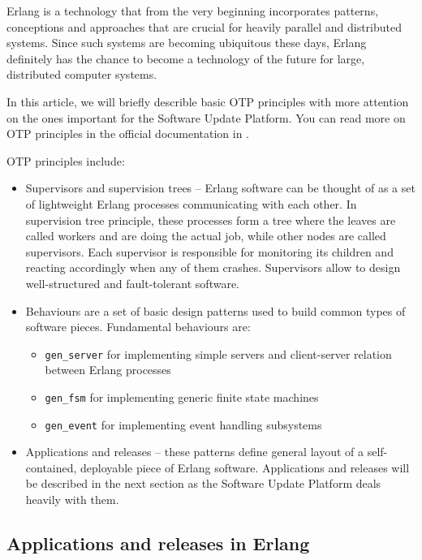 Erlang is a technology that from the very beginning incorporates patterns,
conceptions and approaches that are crucial for heavily parallel and distributed systems.
Since such systems are becoming ubiquitous these days, Erlang definitely has the chance to
become a technology of the future for large, distributed computer systems.

In this article, we will briefly describle basic OTP principles with more attention on
the ones important for the Software Update Platform. You can read more on OTP principles
in the official documentation in \cite{otp}.

OTP principles include:
\begin{itemize}
\item Supervisors and supervision trees -- Erlang software can be thought of as a set of lightweight Erlang processes communicating with
each other. In supervision tree principle, these processes form a tree where the leaves are
called workers and are doing the actual job, while other nodes are called supervisors.
Each supervisor is responsible for monitoring its children and reacting accordingly when
any of them crashes. Supervisors allow to design well-structured and fault-tolerant
software.

\item Behaviours are a set of basic design patterns used to build common types of software
pieces. Fundamental behaviours are:
\begin{itemize}
\item {\tt gen\_server} for implementing simple servers and client-server relation between Erlang
processes
\item {\tt gen\_fsm} for implementing generic finite state machines
\item {\tt gen\_event} for implementing event handling subsystems
\end{itemize}
\item Applications and releases -- these patterns define general layout of a self-contained, deployable piece of Erlang
software. Applications and releases will be described in the next section as the
Software Update Platform deals heavily with them.

\end{itemize}

\subsection{Applications and releases in Erlang}

